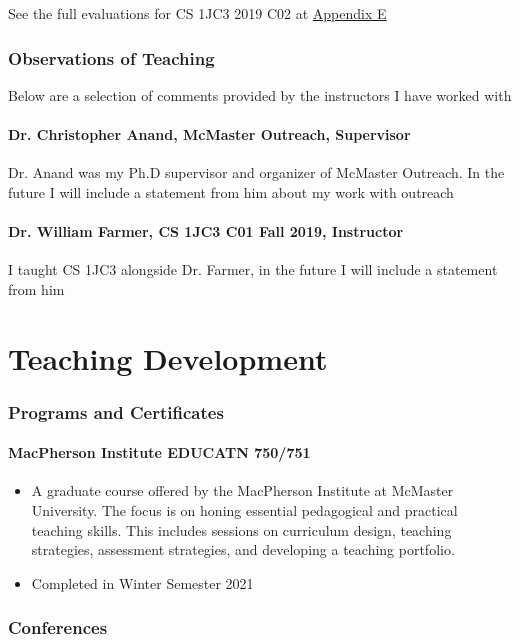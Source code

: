 \documentclass[12pt]{report}
\begin{document}
See the full evaluations for CS 1JC3 2019 C02 at \hyperref[sec:1jc3evals]{Appendix E}

\newpage
\section{Observations of Teaching}
\label{sec:orgb71b249}
Below are a selection of comments provided by the instructors I have worked
with
\subsection{Dr. Christopher Anand, McMaster Outreach, Supervisor}
\label{sec:orgcee7aa4}
Dr. Anand was my Ph.D supervisor and organizer of McMaster Outreach. In the
future I will include a statement from him about my work with outreach
\subsection{Dr. William Farmer, CS 1JC3 C01 Fall 2019, Instructor}
\label{sec:org6d95bca}
I taught CS 1JC3 alongside Dr. Farmer, in the future I will include a
statement from him 

\part{Teaching Development}
\label{sec:orgeff52e9}
\section{Programs and Certificates}
\label{sec:org20c1eff}
\subsection{MacPherson Institute EDUCATN 750/751}
\label{sec:org29289b1}
\begin{itemize}
\item A graduate course offered by the MacPherson Institute at McMaster University. The
focus is on honing essential pedagogical and practical teaching skills. This
includes sessions on curriculum design, teaching strategies, assessment
strategies, and developing a teaching portfolio.
\item Completed in Winter Semester 2021
\end{itemize}

\section{Conferences}
\label{sec:orgd95c756}
\end{document}
